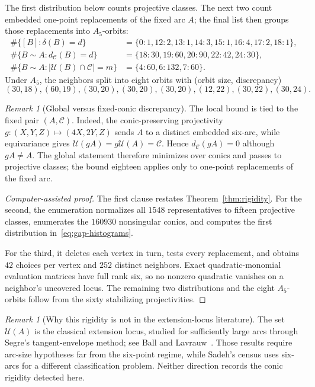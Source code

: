 \documentclass[11pt]{article}
\theoremstyle{definition}
\theoremstyle{remark}
\newtheorem{remark}[theorem]{Remark}
\newcommand{\cC}{\mathcal{C}}
\newcommand{\cU}{\mathcal{U}}
\begin{document}
The first distribution below counts projective classes. The next two count
embedded one-point replacements of the fixed arc $A$; the final list then
groups those replacements into $A_5$-orbits:
\begin{equation}
\label{eq:gap-histograms}
\begin{aligned}
\#\{[B]:\delta(B)=d\}
 &=\{0{:}1,12{:}2,13{:}1,14{:}3,15{:}1,16{:}4,17{:}2,18{:}1\},\\
\#\{B\sim A:d_{\cC}(B)=d\}
 &=\{18{:}30,19{:}60,20{:}90,22{:}42,24{:}30\},\\
\#\{B\sim A:|\cU(B)\cap\cC|=m\}
 &=\{4{:}60,6{:}132,7{:}60\}.
\end{aligned}
\end{equation}
Under $A_5$, the neighbors split into eight orbits with
(orbit size, discrepancy)
\[
 (30,18),(60,19),(30,20),(30,20),(30,20),(12,22),(30,22),(30,24).
\]

\begin{remark}[Global versus fixed-conic discrepancy]
The local bound is tied to the fixed pair $(A,\cC)$. Indeed, the
conic-preserving projectivity
$g:(X,Y,Z)\mapsto(4X,2Y,Z)$ sends $A$ to a distinct embedded six-arc, while
equivariance gives $\cU(gA)=g\cU(A)=\cC$. Hence
$d_{\cC}(gA)=0$ although $gA\ne A$. The global statement therefore minimizes
over conics and passes to projective classes; the bound eighteen applies
only to one-point replacements of the fixed arc.
\end{remark}

\begin{proof}[Computer-assisted proof]
The first clause restates Theorem~\ref{thm:rigidity}. For the second, the
enumeration normalizes all $1548$ representatives to fifteen projective
classes, enumerates the $160930$ nonsingular conics, and computes the first
distribution in~\eqref{eq:gap-histograms}.

For the third, it deletes each vertex in turn, tests every replacement, and
obtains $42$ choices per vertex and $252$ distinct neighbors. Exact
quadratic-monomial evaluation matrices have full rank six, so no nonzero
quadratic vanishes on a neighbor's uncovered locus. The remaining two
distributions and the eight $A_5$-orbits follow from the sixty stabilizing
projectivities.
\end{proof}

\begin{remark}[Why this rigidity is not in the extension-locus literature]
The set $\cU(A)$ is the classical extension locus, studied for sufficiently
large arcs through Segre's tangent-envelope method; see Ball and
Lavrauw~\cite[Thms.~39--41]{BallLavrauw2019}. Those results require arc-size
hypotheses far from the six-point regime, while Sadeh's census uses six-arcs
for a different classification problem. Neither direction records the
conic rigidity detected here.
\end{remark}
\end{document}
